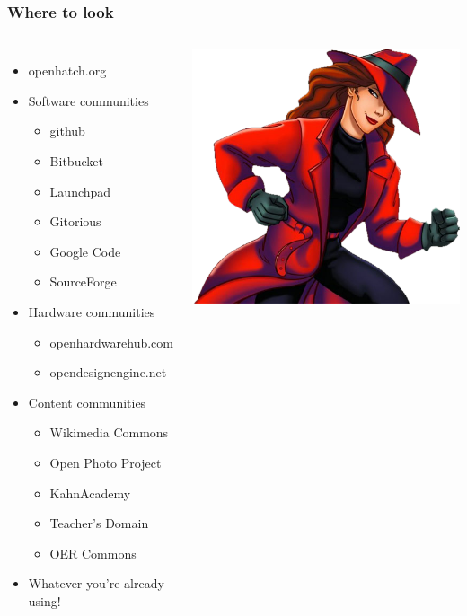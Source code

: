 \documentclass{beamer}
\begin{document}
\begin{frame}
  \frametitle{Where to look}
  \begin{columns}[c]
    \begin{itemize}
    \item openhatch.org
    \item Software communities 
      \begin{itemize}
      \item github
      \item Bitbucket
      \item Launchpad
      \item Gitorious
      \item Google Code
      \item SourceForge
      \end{itemize}
    \item Hardware communities
      \begin{itemize}
      \item openhardwarehub.com
      \item opendesignengine.net
      \end{itemize}
    \item Content communities
      \begin{itemize}
      \item Wikimedia Commons
      \item Open Photo Project
      \item KahnAcademy
      \item Teacher's Domain
      \item OER Commons
      \end{itemize}
    \item Whatever you're already using!
    \end{itemize}
    \includegraphics[width=1\textwidth]{../img/carmen-sandiego}

\end{columns}
\end{frame}
\end{document}
